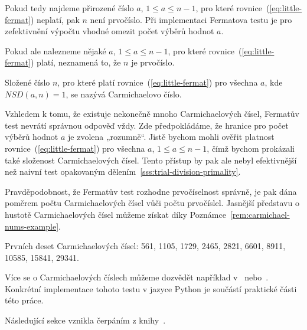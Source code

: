 \documentclass[
  program=infoi,
  biblatex=false,
  figures=true,
  glossaries,
  tables=false,
  sourcecodes=true,
  index
]{kidiplom}
\begin{document}
            Pokud tedy najdeme přirozené číslo $a$, $1 \leq a \leq n-1$, pro které rovnice~(\ref{eq:little-fermat}) neplatí, pak
            $n$ není prvočíslo.
            Při implementaci Fermatova testu je pro zefektivnění výpočtu vhodné omezit počet výběrů hodnot $a$.
            
            Pokud ale nalezneme nějaké $a$, $1 \leq a \leq n-1$, pro které rovnice~(\ref{eq:little-fermat}) platí,
            neznamená to, že $n$ je prvočíslo.

            \begin{definition}
                Složené číslo $n$, pro které platí rovnice~(\ref{eq:little-fermat}) pro všechna $a$, kde $NSD(a,n) = 1$, se
                nazývá Carmichaelovo číslo.
            \end{definition}
            
            Vzhledem k tomu, že existuje nekonečně mnoho Carmichaelových čísel,
            Fermatův test nevrátí správnou odpověď vždy.
            Zde předpokládáme, že hranice pro počet výběrů hodnot $a$ je zvolena „rozumně“.
            Jistě bychom mohli ověřit platnost rovnice~(\ref{eq:little-fermat}) pro všechna $a$, $1 \leq a \leq n-1$,
            čímž bychom prokázali také složenost Carmichaelových čísel.
            Tento přístup by pak ale nebyl efektivnější než naivní test opakovaným dělením~\ref{sss:trial-division-primality}.

            Pravděpodobnost, že Fermatův test rozhodne prvočíselnost správně,
            je pak dána poměrem počtu Carmichaelových čísel vůči počtu prvočíslel.
            Jasnější představu o hustotě Carmichaelových čísel můžeme získat díky Poznámce~\ref{rem:carmichael-nums-example}.

            \begin{remark}\label{rem:carmichael-nums-example}
                Prvních deset Carmichaelových čísel: 561, 1105, 1729, 2465, 2821, 6601, 8911, 10585, 15841, 29341.
            \end{remark}

            Více se o Carmichaelových číslech můžeme dozvědět například v~\cite{computational-introduction} nebo~\cite{primes-and-factorization}. 
            Konkrétní implementace tohoto testu v jazyce Python je součástí praktické části této práce.



            Následující sekce vznikla čerpáním z knihy~\cite{handbook}.
\end{document}
